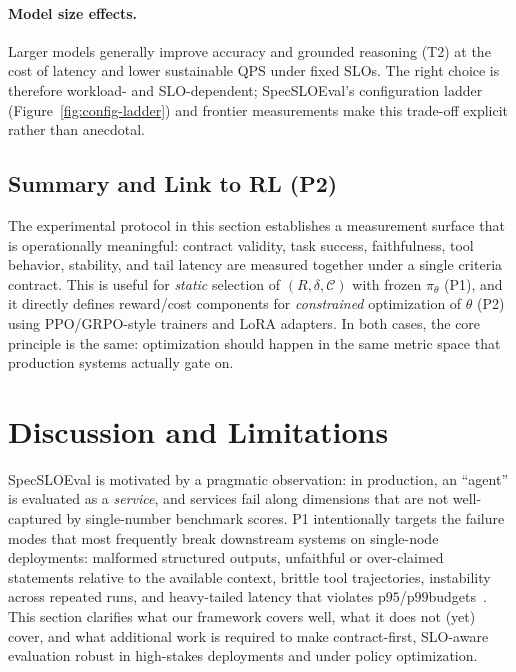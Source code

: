 \documentclass[11pt]{article}
\newcommand{\pninetyfive}{\ensuremath{\mathrm{p95}}}
\newcommand{\pninetynine}{\ensuremath{\mathrm{p99}}}
\begin{document}
\paragraph{Model size effects.}
Larger models generally improve accuracy and grounded reasoning (T2) at the cost of latency and lower sustainable QPS under fixed SLOs.
The right choice is therefore workload- and SLO-dependent; SpecSLOEval’s configuration ladder (Figure~\ref{fig:config-ladder}) and frontier measurements make this trade-off explicit rather than anecdotal.

\subsection{Summary and Link to RL (P2)}
\label{sec:results-summary}

The experimental protocol in this section establishes a measurement surface that is operationally meaningful:
contract validity, task success, faithfulness, tool behavior, stability, and tail latency are measured together under a single criteria contract.
This is useful for \emph{static} selection of $(R,\delta,\mathcal{C})$ with frozen $\pi_\theta$ (P1), and it directly defines reward/cost components for \emph{constrained} optimization of $\theta$ (P2) using PPO/GRPO-style trainers and LoRA adapters.
In both cases, the core principle is the same: optimization should happen in the same metric space that production systems actually gate on.

\section{Discussion and Limitations}
\label{sec:discussion}

SpecSLOEval is motivated by a pragmatic observation: in production, an ``agent'' is evaluated as a \emph{service}, and services fail along dimensions that are not well-captured by single-number benchmark scores.
P1 intentionally targets the failure modes that most frequently break downstream systems on single-node deployments: malformed structured outputs, unfaithful or over-claimed statements relative to the available context, brittle tool trajectories, instability across repeated runs, and heavy-tailed latency that violates \pninetyfive/\pninetynine budgets~\citep{dean2013tail}.
This section clarifies what our framework covers well, what it does not (yet) cover, and what additional work is required to make contract-first, SLO-aware evaluation robust in high-stakes deployments and under policy optimization.
\end{document}

